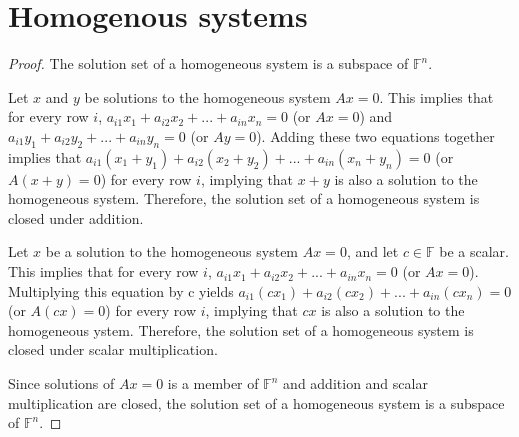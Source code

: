 \section{Homogenous systems}
\begin{proof}The solution set of a homogeneous system is a subspace of $\mathbb{F}^n$.\gap

    Let $x$ and $y$ be solutions to the homogeneous system $Ax=0$.
    This implies that for every row $i$, 
    $a_{i1}x_1 + a_{i2}x_2 + ... + a_{in}x_n = 0$ (or $Ax=0$) and 
    $a_{i1}y_1 + a_{i2}y_2 + ... + a_{in}y_n = 0$ (or $Ay=0$).
    Adding these two equations together implies that
    $a_{i1}(x_1+y_1) + a_{i2}(x_2+y_2) + ... + a_{in}(x_n+y_n) = 0$ (or $A(x+y)=0$)
    for every row $i$, implying that $x+y$ is also a solution to the homogeneous system.
    Therefore, the solution set of a homogeneous system is closed under addition.\gap
    
    Let $x$ be a solution to the homogeneous system $Ax=0$, and 
    let $c \in \mathbb{F}$ be a scalar.
    This implies that for every row $i$,
    $a_{i1}x_1 + a_{i2}x_2 + ... + a_{in}x_n = 0$ (or $Ax=0$).
    Multiplying this equation by c yields
    $a_{i1}(cx_1) + a_{i2}(cx_2) + ... + a_{in}(cx_n) = 0$ (or $A(cx)=0$)
    for every row $i$, implying that $cx$ is also a solution to the homogeneous ystem.
    Therefore, the solution set of a homogeneous system is closed under scalar multiplication.\gap

    Since solutions of $Ax=0$ is a member of $\mathbb{F}^n$
    and addition and scalar multiplication are closed,
    the solution set of a homogeneous system is a subspace of $\mathbb{F}^n$.
\end{proof}